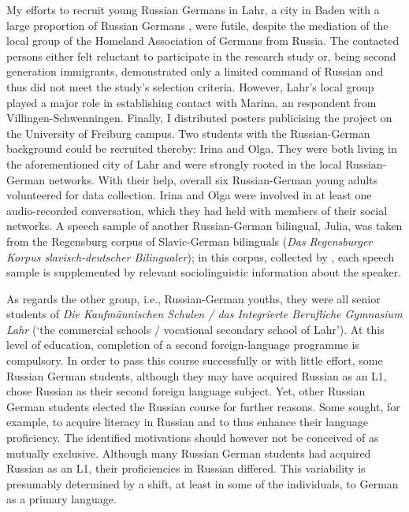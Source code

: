 My efforts to recruit young Russian Germans in Lahr, a city in Baden with a large proportion of Russian Germans \citep[cf.][]{roll03}, were futile, despite the mediation of the local group of the Homeland Association of Germans from Russia. The contacted persons either felt reluctant to participate in the research study or, being second generation immigrants, demonstrated only a limited command of Russian and thus did not meet the study's selection criteria. However, Lahr's local group played a major role in establishing contact with Marina, an respondent from Villingen-Schwenningen. Finally, I distributed posters publicising the project on the University of Freiburg campus. Two students with the Russian-German background could be recruited thereby: Irina and Olga. They were both living in the aforementioned city of Lahr and were strongly rooted in the local Russian-German networks. With their help, overall six Russian-German young adults volunteered for data collection. Irina and Olga were involved in at least one audio-recorded conversation, which they had held with members of their social networks. A speech sample of another Russian-German bilingual, Julia, was taken from the Regensburg corpus of Slavic-German bilinguals (\textit{Das Regensburger Korpus slavisch-deutscher Bilingualer}); in this corpus, collected by \citet{rebislav}, each speech sample is supplemented by relevant sociolinguistic information about the speaker.

As regards the other group, i.e., Russian-German youths, they were all senior students of \textit{Die Kaufmännischen Schulen \textnormal{/} das Integrierte Berufliche Gymnasium Lahr} (`the commercial schools / vocational secondary school of Lahr'). At this level of education, completion of a second foreign-language programme is compulsory. In order to pass this course successfully or with little effort, some Russian German students, although they may have acquired Russian as an L1, chose Russian as their second foreign language subject. Yet, other Russian German students elected the Russian course for further reasons. Some sought, for example, to acquire literacy in Russian and to thus enhance their language proficiency. The identified motivations should however not be conceived of as mutually exclusive. Although many Russian German students had acquired Russian as an L1, their proficiencies in Russian differed. This variability is presumably determined by a shift, at least in some of the individuals, to German as a primary language.


